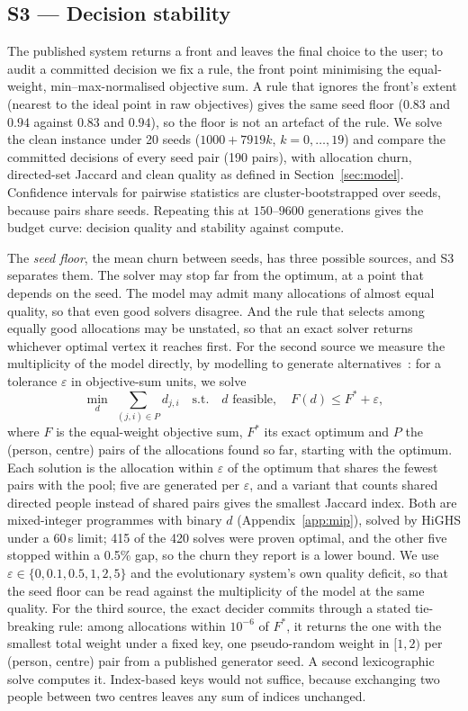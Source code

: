 \documentclass[systems,article,submit,moreauthors,pdftex]{Definitions/mdpi}
\begin{document}
\subsection{S3 --- Decision stability}
The published system returns a front and leaves the final choice to the user; to audit a
committed decision we fix a rule, the front point minimising the equal-weight,
min--max-normalised objective sum. A rule that ignores the front's extent (nearest to the
ideal point in raw objectives) gives the same seed floor ($0.83$ and $0.94$ against $0.83$
and $0.94$), so the floor is not an artefact of the rule. We solve the clean instance under 20 seeds
($1000 + 7919k$, $k = 0,\dots,19$) and compare the committed decisions of every seed pair
(190 pairs), with allocation churn, directed-set Jaccard and clean quality as defined in
Section~\ref{sec:model}. Confidence intervals for pairwise statistics are cluster-bootstrapped
over seeds, because pairs share seeds. Repeating this at $150$--$9600$ generations gives the
budget curve: decision quality and stability against compute.

The \emph{seed floor}, the mean churn between seeds, has three possible sources, and S3
separates them. The solver may stop far from the optimum, at a point that depends on the
seed. The model may admit many allocations of almost equal quality, so that even good
solvers disagree. And the rule that selects among equally good allocations may be unstated,
so that an exact solver returns whichever optimal vertex it reaches first. For the second
source we measure the multiplicity of the model directly, by modelling to generate
alternatives~\cite{brill1982mga}: for a tolerance $\varepsilon$ in objective-sum units, we
solve
\begin{equation}
\min_{d}\; \sum_{(j,i) \in P} d_{j,i}
\quad\text{s.t.}\quad d \text{ feasible},\quad F(d) \le F^\ast + \varepsilon,
\label{eq:mga}
\end{equation}
where $F$ is the equal-weight objective sum, $F^\ast$ its exact optimum and $P$ the
(person, centre) pairs of the allocations found so far, starting with the optimum. Each
solution is the allocation within $\varepsilon$ of the optimum that shares the fewest pairs
with the pool; five are generated per $\varepsilon$, and a variant that counts shared
directed people instead of shared pairs gives the smallest Jaccard index. Both are
mixed-integer programmes with binary $d$ (Appendix~\ref{app:mip}), solved by HiGHS under a
60\,s limit; 415 of the 420 solves were proven optimal, and the other five stopped within a
0.5\% gap, so the churn they report is a lower bound. We use $\varepsilon \in \{0, 0.1, 0.5, 1, 2, 5\}$ and
the evolutionary system's own quality deficit, so that the seed floor can be read against the
multiplicity of the model at the same quality. For the third source, the exact decider
commits through a stated tie-breaking rule: among allocations within $10^{-6}$ of $F^\ast$, it
returns the one with the smallest total weight under a fixed key, one pseudo-random weight in
$[1, 2)$ per (person, centre) pair from a published generator seed. A second lexicographic
solve computes it. Index-based keys would not suffice, because exchanging two people between
two centres leaves any sum of indices unchanged.
\end{document}
